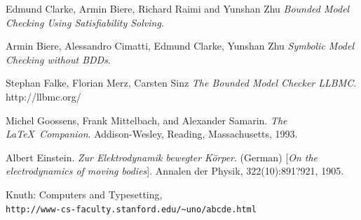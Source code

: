 \documentclass[14pt]{article}
\begin{document}
\begin{thebibliography}{9}
Edmund Clarke, Armin Biere, Richard Raimi and Yunshan Zhu
\textit{Bounded Model Checking Using Satisfiability Solving}.

Armin Biere, Alessandro Cimatti, Edmund Clarke, Yunshan Zhu
\textit{Symbolic Model Checking without BDDs}. 

Stephan Falke, Florian Merz, Carsten Sinz
\textit{The Bounded Model Checker LLBMC}. 
http://llbmc.org/





Michel Goossens, Frank Mittelbach, and Alexander Samarin. 
\textit{The \LaTeX\ Companion}. 
Addison-Wesley, Reading, Massachusetts, 1993.
 
Albert Einstein. 
\textit{Zur Elektrodynamik bewegter K{\"o}rper}. (German) 
[\textit{On the electrodynamics of moving bodies}]. 
Annalen der Physik, 322(10):891?921, 1905.
 
Knuth: Computers and Typesetting,
\\\texttt{http://www-cs-faculty.stanford.edu/\~{}uno/abcde.html}
\end{thebibliography}
\end{document}
